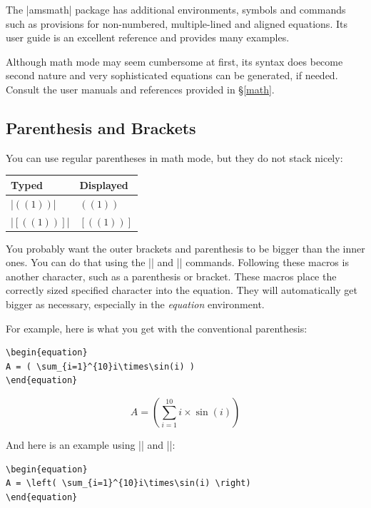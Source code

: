 The |amsmath| package has additional environments, symbols and
commands such as provisions for non-numbered,
multiple-lined and aligned equations. Its user guide is an
excellent reference and provides many examples.

Although math mode may seem cumbersome at first, its syntax does become second nature and very sophisticated equations can be generated, if needed.
Consult the user manuals and references provided in \S\ref{math}.

\subsection{Parenthesis and Brackets}
You can use regular parentheses in math mode, but they do not stack nicely:

\begin{center}
\begin{tabular}{l|l}
Typed                   & Displayed\\\hline
|$((1))$| & $((1))$\\
|$[((1))]$| & $[((1))]$
\end{tabular}
\end{center}


You probably want the outer brackets and parenthesis to be bigger than
the inner ones. You can do that using the |\left| and |\right|
commands.  Following these macros is another character, such as a
parenthesis or bracket.  
These macros place the correctly sized
specified character into the equation.  They will automatically get
bigger as necessary, especially in the \emph{equation} environment.

For example, here is what you get with the conventional parenthesis:
\begin{Verbatim}
\begin{equation}
A = ( \sum_{i=1}^{10}i\times\sin(i) )
\end{equation}
\end{Verbatim}

\begin{equation}
A = ( \sum_{i=1}^{10}i\times\sin(i) )
\end{equation}

And here is an example using |\left| and |\right|:

\begin{Verbatim}
\begin{equation}
A = \left( \sum_{i=1}^{10}i\times\sin(i) \right)
\end{equation}
\end{Verbatim}


